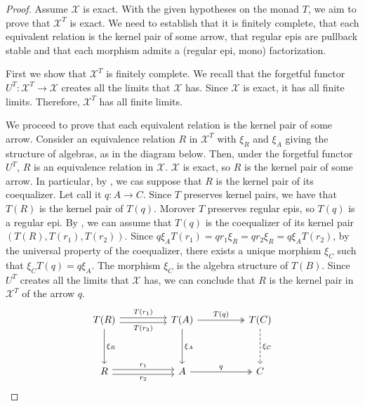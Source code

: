 \begin{subbox}{}
    \begin{proof}
        Assume $\mathcal{X}$ is exact. With the given hypotheses on the monad $T$, we aim to prove that $\mathcal{X}^T$ is exact. We need to establish that it is finitely complete, that each equivalent relation is the kernel pair of some arrow, that regular epis are pullback stable and that each morphism admits a (regular epi, mono) factorization.

        First we show that $\mathcal{X}^T$ is finitely complete. We recall that the forgetful functor $U^T:\mathcal{X}^T \to \mathcal{X}$ creates all the limits that $\mathcal{X}$ has. Since $\mathcal{X}$ is exact, it has all finite limits. Therefore, $\mathcal{X}^T$ has all finite limits.

        We proceed to prove that each equivalent relation is the kernel pair of some arrow. Consider an equivalence relation $R$ in $\mathcal{X}^T$ with $\xi_R$ and $\xi_A$ giving the structure of algebras, as in the diagram below. Then, under the forgetful functor $U^T$, $R$ is an equivalence relation in $\mathcal{X}$. $\mathcal{X}$ is exact, so $R$ is the kernel pair of some arrow. In particular, by , we cas suppose that $R$ is the kernel pair of its coequalizer. Let call it $q:A \to C$. Since $T$ preserves kernel pairs, we have that $T(R)$ is the kernel pair of $T(q)$. Morover $T$ preserves regular epis, so $T(q)$ is a regular epi. By , we can assume that $T(q)$ is the coequalizer of its kernel pair $(T(R),T(r_1),T(r_2))$. Since $q\xi_AT(r_1)= qr_1\xi_R = qr_2\xi_R=q\xi_AT(r_2)$, by the universal property of the coequalizer, there exists a unique morphism $\xi_C$ such that $\xi_CT(q) = q\xi_A$. The morphism $\xi_C$ is the algebra structure of $T(B)$. Since $U^T$ creates all the limits that $\mathcal{X}$ has, we can conclude that $R$ is the kernel pair in $\mathcal{X}^T$ of the arrow $q$.
        \[
\begin{tikzcd}
T(R) \arrow[dd, "\xi_R"] \arrow[rr, "T(r_1)", shift left] \arrow[rr, "T(r_2)"', shift right] &  & T(A) \arrow[dd, "\xi_A"] \arrow[rr, "T(q)", two heads] &  & T(C) \arrow[dd, "\xi_C", dashed] \\
                                                                                             &  &                                                        &  &                                  \\
R \arrow[rr, "r_1", shift left] \arrow[rr, "r_2"', shift right]                              &  & A \arrow[rr, "q", two heads]                           &  & C                               
\end{tikzcd}
    \]


\end{proof}
\end{subbox}
